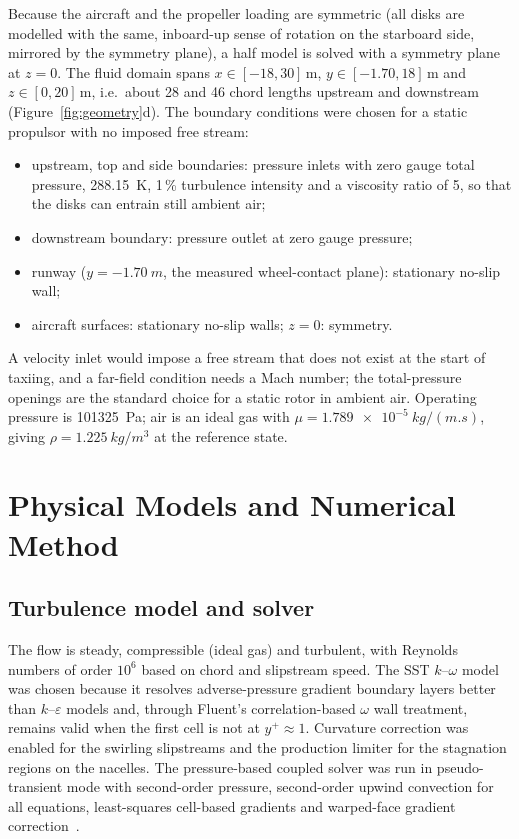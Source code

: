 \documentclass[10pt,a4paper]{article}
\begin{document}
Because the aircraft and the propeller loading are symmetric (all disks are modelled with the same, inboard-up sense
of rotation on the starboard side, mirrored by the symmetry plane), a half model is solved with a symmetry plane at
$z=0$. The fluid domain spans $x\in[-18,30]$\,m, $y\in[-1.70,18]$\,m and $z\in[0,20]$\,m, i.e.\ about 28 and 46
chord lengths upstream and downstream (Figure~\ref{fig:geometry}d). The boundary conditions were chosen for a
static propulsor with no imposed free stream:
\begin{itemize}[leftmargin=1.3em,itemsep=1pt,topsep=2pt]
  \item upstream, top and side boundaries: pressure inlets with zero gauge total pressure, \SI{288.15}{K},
        1\,\% turbulence intensity and a viscosity ratio of 5, so that the disks can entrain still ambient air;
  \item downstream boundary: pressure outlet at zero gauge pressure;
  \item runway ($y=\SI{-1.70}{m}$, the measured wheel-contact plane): stationary no-slip wall;
  \item aircraft surfaces: stationary no-slip walls; $z=0$: symmetry.
\end{itemize}
A velocity inlet would impose a free stream that does not exist at the start of taxiing, and a far-field condition
needs a Mach number; the total-pressure openings are the standard choice for a static rotor in ambient air.
Operating pressure is \SI{101325}{Pa}; air is an ideal gas with $\mu=\SI{1.789e-5}{kg/(m.s)}$, giving
$\rho=\SI{1.225}{kg/m^3}$ at the reference state.

\section{Physical Models and Numerical Method}
\label{sec:models}
\subsection{Turbulence model and solver}
The flow is steady, compressible (ideal gas) and turbulent, with Reynolds numbers of order $10^6$ based on chord and
slipstream speed. The SST $k$--$\omega$ model~\cite{menter1994sst} was chosen because it resolves adverse-pressure
gradient boundary layers better than $k$--$\varepsilon$ models and, through Fluent's correlation-based
$\omega$ wall treatment, remains valid when the first cell is not at $y^+\approx1$. Curvature correction
\cite{spalart1997sarc} was enabled for the swirling slipstreams and the production limiter for the stagnation
regions on the nacelles. The pressure-based coupled solver was run in pseudo-transient mode with second-order
pressure, second-order upwind convection for all equations, least-squares cell-based gradients and warped-face
gradient correction~\cite{ansys2025fluent}.
\end{document}
